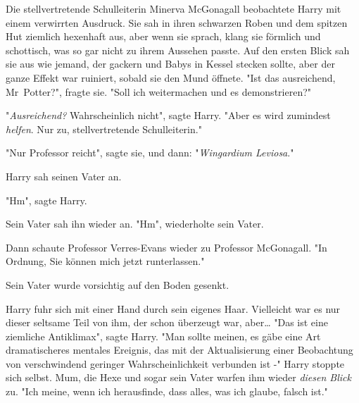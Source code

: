 Die stellvertretende Schulleiterin Minerva McGonagall beobachtete Harry mit einem verwirrten Ausdruck. Sie sah in ihren schwarzen Roben und dem spitzen Hut ziemlich hexenhaft aus, aber wenn sie sprach, klang sie förmlich und schottisch, was so gar nicht zu ihrem Aussehen passte. Auf den ersten Blick sah sie aus wie jemand, der gackern und Babys in Kessel stecken sollte, aber der ganze Effekt war ruiniert, sobald sie den Mund öffnete. "Ist das ausreichend, Mr~Potter?", fragte sie. "Soll ich weitermachen und es demonstrieren?"

"\emph{Ausreichend?} Wahrscheinlich nicht", sagte Harry. "Aber es wird zumindest \emph{helfen}. Nur zu, stellvertretende Schulleiterin."

"Nur Professor reicht", sagte sie, und dann: "\emph{Wingardium Leviosa}."

Harry sah seinen Vater an.

"Hm", sagte Harry.

Sein Vater sah ihn wieder an. "Hm", wiederholte sein Vater.

Dann schaute Professor Verres-Evans wieder zu Professor McGonagall. "In Ordnung, Sie können mich jetzt runterlassen."

Sein Vater wurde vorsichtig auf den Boden gesenkt.

Harry fuhr sich mit einer Hand durch sein eigenes Haar. Vielleicht war es nur dieser seltsame Teil von ihm, der schon überzeugt war, aber… "Das ist eine ziemliche Antiklimax", sagte Harry. "Man sollte meinen, es gäbe eine Art dramatischeres mentales Ereignis, das mit der Aktualisierung einer Beobachtung von verschwindend geringer Wahrscheinlichkeit verbunden ist -" Harry stoppte sich selbst. Mum, die Hexe und sogar sein Vater warfen ihm wieder \emph{diesen Blick} zu. "Ich meine, wenn ich herausfinde, dass alles, was ich glaube, falsch ist."

